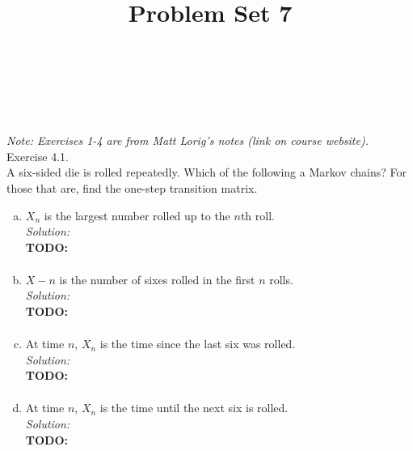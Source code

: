 \documentclass[10pt]{amsart}
\begin{document}
\noindent
{} \\
 \\
 \\
\title{Problem Set 7}
\maketitle

{\it Note: Exercises 1-4 are from Matt Lorig's
notes (link on course website).}
\\

 Exercise 4.1. \\
A six-sided die is rolled repeatedly. Which of the following a Markov chains? For those
that are, find the one-step transition matrix.\\

\begin{enumerate}[(a)]
\item $X_n$ is the largest number rolled up to the $n$th roll. \\

\noindent
\textit{Solution:} \\
\textbf{TODO:} \\
\begin{align*}
\end{align*}


\item $X - n$ is the number of sixes rolled in the first $n$ rolls. \\

\noindent
\textit{Solution:} \\
\textbf{TODO:} \\
\begin{align*}
\end{align*}


\item At time $n$, $X_n$ is the time since the last six was rolled. \\

\noindent
\textit{Solution:} \\
\textbf{TODO:} \\
\begin{align*}
\end{align*}


\item At time $n$, $X_n$ is the time until the next six is rolled. \\

\noindent
\textit{Solution:} \\
\textbf{TODO:} \\
\begin{align*}
\end{align*}


\end{enumerate}
\newpage
\end{document}
